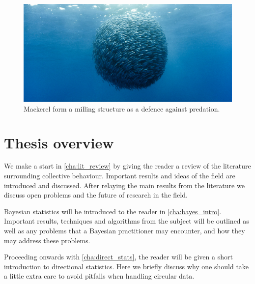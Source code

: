 \begin{figure}[tb]
    \includegraphics[width=\textwidth]{milling.jpg}
    \caption{Mackerel form a milling structure as a defence against predation.}
    \label{fig:milling}
\end{figure}

\section{Thesis overview}
\label{sec:overview_of_thesis}

We make a start in \cref{cha:lit_review} by giving the reader a
review of the literature surrounding collective behaviour. Important results and ideas of
the field are introduced and discussed. After relaying the main results from the
literature we discuss open problems and the future of research in the field.

Bayesian statistics will be introduced to the reader in \cref{cha:bayes_intro}. Important
results, techniques and algorithms from the subject will be outlined as well as any
problems that a Bayesian practitioner may encounter, and how they may address these problems.

Proceeding onwards with \cref{cha:direct_stats}, the reader will be given a short
introduction to directional statistics. Here we briefly discuss why one should take a
little extra care to avoid pitfalls when handling circular data.



